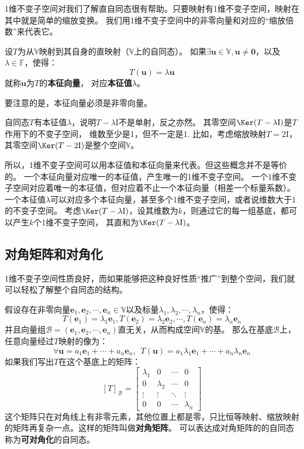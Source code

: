 \documentclass[12pt,UTF8]{ctexbook}
\begin{document}
1维不变子空间对我们了解直自同态很有帮助。只要映射有1维不变子空间，映射在其中就是简单的缩放变换。
我们用1维不变子空间中的非零向量和对应的“缩放倍数”来代表它。

\begin{df}\label{df:6_2}
    设$T$为从$\mathbb{V}$映射到其自身的直映射（$\mathbb{V}$上的自同态）。
    如果$\exists \mathbf{u} \in \mathbb{V}, \mathbf{u} \neq \mathbf{0}$，以及$\lambda \in \mathbb{F}$，使得： 
    $$ T(\mathbf{u}) = \lambda \mathbf{u} $$
    就称$\mathbf{u}$为$T$的\textbf{本征向量}，
    对应\textbf{本征值}$\lambda$。
\end{df}
要注意的是，本征向量必须是非零向量。

自同态$T$有本征值$\lambda$，说明$T - \lambda \mathrm{I}$不是单射，反之亦然。
其零空间$\Ker (T - \lambda \mathrm{I})$是$T$作用下的不变子空间，
维数至少是1，但不一定是1. 比如，考虑缩放映射$T = 2\mathrm{I}$，
其零空间$\Ker (T - 2 \mathrm{I})$是整个空间$\mathbb{V}$。

所以，1维不变子空间可以用本征值和本征向量来代表。但这些概念并不是等价的。
一个本征向量对应唯一的本征值，产生唯一的1维不变子空间。
一个1维不变子空间对应着唯一的本征值，但对应着不止一个本征向量（相差一个标量系数）。
一个本征值$\lambda$可以对应多个本征向量，甚至多个1维不变子空间，或者说维数大于1的不变子空间。
考虑$\Ker (T - \lambda \mathrm{I})$，设其维数为$k$，则通过它的每一组基底，都可以产生$k$个1维不变子空间，
其直和为$\Ker (T - \lambda \mathrm{I})$。

\subsection{对角矩阵和对角化}
1维不变子空间性质良好，而如果能够把这种良好性质“推广”到整个空间，我们就可以轻松了解整个自同态的结构。

假设存在非零向量$\mathbf{e}_1, \mathbf{e}_2, \cdots, \mathbf{e}_n \in \mathbb{V}$以及标量$\lambda_1, \lambda_2, \cdots, \lambda_n$，使得：
$$ T(\mathbf{e}_1) = \lambda_1 \mathbf{e}_1, T(\mathbf{e}_2) = \lambda_2 \mathbf{e}_2, \cdots , T(\mathbf{e}_n) = \lambda_n \mathbf{e}_n$$
并且向量组$\mathcal{B} = (\mathbf{e}_1, \mathbf{e}_2, \cdots, \mathbf{e}_n)$直无关，从而构成空间$\mathbb{V}$的基。
那么在基底$\mathcal{B}$上，任意向量经过$T$映射的像为：
$$ \forall \mathbf{u} = a_1 \mathbf{e}_1 + \cdots + a_n \mathbf{e}_n, \,\,\, T(\mathbf{u}) = a_1 \lambda_1 \mathbf{e}_1 + \cdots + a_n \lambda_n \mathbf{e}_n$$
如果我们写出$T$在这个基底上的矩阵：
$$ [T]_{\mathcal{B}} = \begin{bmatrix} \lambda_1 & 0 & \cdots & 0 \\ 0 & \lambda_2 & \cdots & 0 \\ \vdots & \vdots & \ddots & \vdots \\ 0 & 0 & \cdots & \lambda_n \end{bmatrix}$$
这个矩阵只在对角线上有非零元素，其他位置上都是零，只比恒等映射、缩放映射的矩阵再复杂一点。这样的矩阵叫做\textbf{对角矩阵}。
可以表达成对角矩阵的的自同态称为\textbf{可对角化}的自同态。
\end{document}
